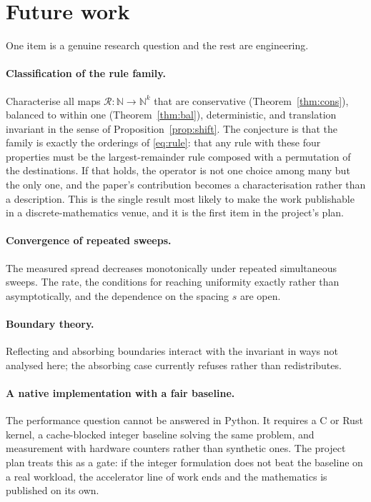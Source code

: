 \documentclass[11pt,a4paper]{article}
\theoremstyle{definition}
\newcommand{\N}{\mathbb{N}}
\newcommand{\R}{\mathcal{R}}
\begin{document}
\section{Future work}\label{sec:future}

One item is a genuine research question and the rest are engineering.

\paragraph{Classification of the rule family.} Characterise all maps
$\R : \N \to \N^k$ that are conservative (Theorem~\ref{thm:cons}), balanced to
within one (Theorem~\ref{thm:bal}), deterministic, and translation invariant in
the sense of Proposition~\ref{prop:shift}. The conjecture is that the family is
exactly the orderings of \eqref{eq:rule}: that any rule with these four
properties must be the largest-remainder rule composed with a permutation of
the destinations. If that holds, the operator is not one choice among many but
the only one, and the paper's contribution becomes a characterisation rather
than a description. This is the single result most likely to make the work
publishable in a discrete-mathematics venue, and it is the first item in the
project's plan.

\paragraph{Convergence of repeated sweeps.} The measured spread decreases
monotonically under repeated simultaneous sweeps. The rate, the conditions for
reaching uniformity exactly rather than asymptotically, and the dependence on
the spacing $s$ are open.

\paragraph{Boundary theory.} Reflecting and absorbing boundaries interact with
the invariant in ways not analysed here; the absorbing case currently refuses
rather than redistributes.

\paragraph{A native implementation with a fair baseline.} The performance
question cannot be answered in Python. It requires a C or Rust kernel, a
cache-blocked integer baseline solving the same problem, and measurement with
hardware counters rather than synthetic ones. The project plan treats this as a
gate: if the integer formulation does not beat the baseline on a real workload,
the accelerator line of work ends and the mathematics is published on its own.
\end{document}

